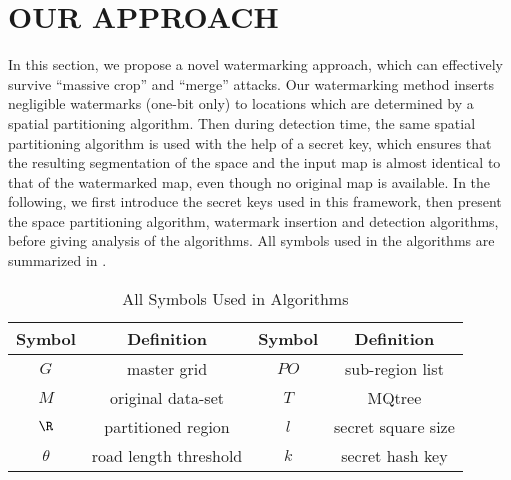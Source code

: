 \section{OUR APPROACH}
\label{sec:appr}

In this section, we propose a novel watermarking approach, 
which can effectively survive ``massive crop'' and ``merge'' attacks.
Our watermarking method %
inserts negligible watermarks (one-bit only)
to locations which are determined by a spatial partitioning algorithm.
Then during detection time, the same spatial partitioning algorithm is used
with the help of a secret key, which ensures that the resulting segmentation of
the space and the input map is almost identical to that of the watermarked map,
even though no original map is available.
In the following, we first introduce the secret keys used in this framework,
then present the space partitioning algorithm, watermark insertion and detection
algorithms, before giving analysis of the algorithms. All symbols used in the algorithms
are summarized in .

\begin{table}[th]
\centering
\caption{All Symbols Used in Algorithms}
\label{tab:para}
\begin{tabular}{|c|c||c|c|} 
\hline
\bf Symbol & \bf Definition & \bf Symbol & \bf Definition \\\hline \hline
$G$ & master grid & $PO$ & sub-region list \\\hline
$M$ & original data-set & $T$ & MQtree \\\hline
$\R$& partitioned region & $l$& secret square size \\\hline
$\theta$ & road length threshold & $k$& secret hash key\\\hline
\end{tabular}
\end{table}

